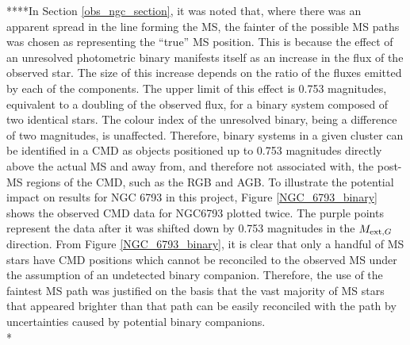 \documentclass[12pt, a4paper]{report}
\begin{document}
****In Section \ref{obs_ngc_section}, it was noted that, where there was an apparent spread in the line forming the MS, the fainter of the possible MS paths was chosen as representing the ``true'' MS position. This is because the effect of an unresolved photometric binary manifests itself as an increase in the flux of the observed star. The size of this increase depends on the ratio of the fluxes emitted by each of the components. The upper limit of this effect is 0.753 magnitudes, equivalent to a doubling of the observed flux, for a binary system composed of two identical stars. The colour index of the unresolved binary, being a difference of two magnitudes, is unaffected. Therefore, binary systems in a given cluster can be identified in a CMD as objects positioned up to 0.753 magnitudes directly above the actual MS and away from, and therefore not associated with, the post-MS regions of the CMD, such as the RGB and AGB. To illustrate the potential impact on results for NGC 6793 in this project, Figure \ref{NGC_6793_binary} shows the observed CMD data for NGC6793 plotted twice. The purple points represent the data after it was shifted down by 0.753 magnitudes in the $M_{\textnormal{ext},G}$ direction. From Figure \ref{NGC_6793_binary}, it is clear that only a handful of MS stars have CMD positions which cannot be reconciled to the observed MS under the assumption of an undetected binary companion. Therefore, the use of the faintest MS path was justified on the basis that the vast majority of MS stars that appeared brighter than that path can be easily reconciled with the path by uncertainties caused by potential binary companions.\\*
\end{document}
